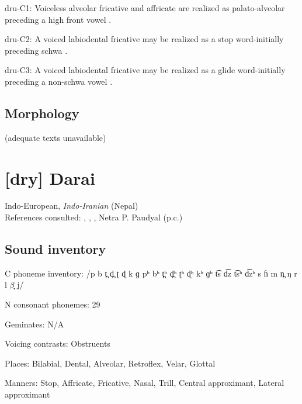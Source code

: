 {\begin{appendixdesc}
\item[dru-C1:] Voiceless alveolar fricative and affricate are realized as palato-alveolar preceding a high front vowel \citep[230]{Chen2006}.

\item[dru-C2:] A voiced labiodental fricative may be realized as a stop word-initially preceding schwa \citep[227]{Chen2006}.

\item[dru-C3:] A voiced labiodental fricative may be realized as a glide word-initially preceding a non-schwa vowel \citep[227]{Chen2006}.
\end{appendixdesc}
\subsection*{Morphology}

(adequate texts unavailable)

\section*{[dry] Darai}  %
Indo-European, \textit{Indo-Iranian} (Nepal)\medskip\\
References consulted: \citet{Dhakal2012}, \citet{KotapishKotapish1973}, \citet{Paudyal2003}, Netra P. Paudyal (p.c.)

\subsection*{Sound inventory}
\begin{appendixdesc}

\item[C phoneme inventory:] /p b t̪ d̪ ʈ ɖ k ɡ pʰ bʰ t̪ʰ d̪ʰ ʈʰ ɖʰ kʰ ɡʰ t͡s d͡z t͡sʰ d͡zʰ s ɦ m n̪ ŋ r l $\beta ̞$ j/

\item[N consonant phonemes:] 29

\item[Geminates:] N/A

\item[Voicing contrasts:] Obstruents

\item[Places:] Bilabial, Dental, Alveolar, Retroflex, Velar, Glottal

\item[Manners:] Stop, Affricate, Fricative, Nasal, Trill, Central approximant, Lateral approximant


\end{appendixdesc}}
